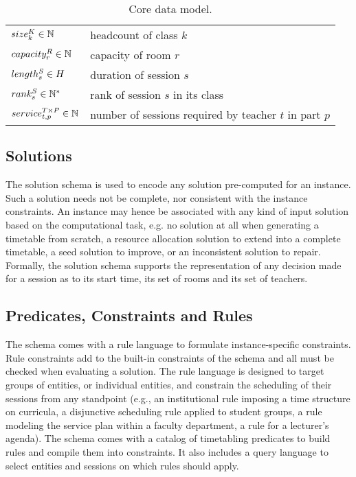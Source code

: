 \documentclass[runningheads]{llncs}
\begin{document}
\begin{table}[!t]
\begin{center}
\begin{tabular}{|l|l|}
\\
$size^{K}_{k}\in{\mathbb{N}}$            &  headcount of class $k$
\\
$capacity^{R}_{r}\in{\mathbb{N}}$             &  capacity of room $r$
\\
$length^{S}_{s}\in{H}$             &  duration of session $s$
\\
$rank^{S}_{s}\in{\mathbb{N}^*}$            &  rank of session $s$ in its class
\\
$service^{{T}\times{P}}_{t,p}\in{\mathbb{N}}$     &  number of sessions required by teacher $t$ in part $p$
\\\hline
\end{tabular}
\caption{Core data model.}
\label{table:entity-model}
\end{center}
\end{table}
%
   \subsection{Solutions}
\label{sec:solution}

The solution schema is used to encode
any solution pre-computed for an instance.
Such a solution needs not be complete, nor consistent with the instance constraints.
An instance may hence be associated with any kind of input solution based on the
computational task,
e.g. no solution at all when generating a timetable from scratch, 
a resource allocation solution to extend into a complete timetable,
a seed solution to improve, 
or an inconsistent solution to repair.
Formally, the solution schema
supports the representation of
any decision made for a session
as to its start time,
its set of rooms
and its set of teachers.





 \subsection{Predicates, Constraints and Rules}
\label{sec:schema-predicates-constraints-rules}

The \UTP{} schema comes with a rule language to formulate instance-specific constraints.
Rule constraints add to the built-in constraints of the schema
and all must be checked when evaluating a solution.
The rule language is designed to target groups of entities, or individual entities,
and constrain the scheduling of their sessions
from any standpoint
(e.g., an institutional rule imposing a time structure on curricula,
a disjunctive scheduling rule applied to student groups,
a rule modeling the service plan within a faculty department,
a rule for a lecturer's agenda).
The schema comes with a catalog of timetabling predicates
to build rules and compile them into constraints.
It also includes a query language to select
entities and sessions on which rules should apply.
\end{document}
